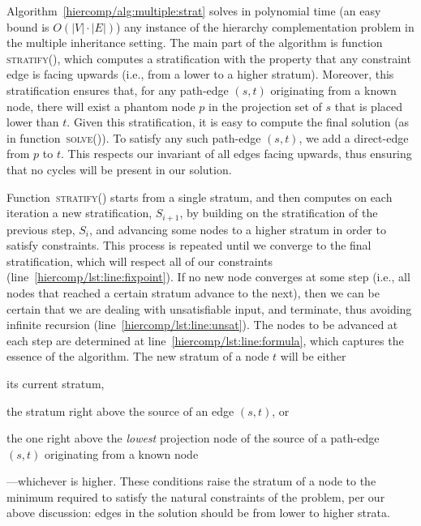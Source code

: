 

Algorithm~\ref{hiercomp/alg:multiple:strat} solves in polynomial time (an easy bound is
$O(|V| \cdot |E|)$) any
instance of the hierarchy complementation problem in the multiple
inheritance setting. The main part of the algorithm is
function \textsc{stratify()}, which computes a stratification with the
property that any constraint edge is facing upwards (i.e., from a
lower to a higher stratum). Moreover, this stratification ensures
that, for any path-edge $(s,t)$ originating from a known node, there
will exist a phantom node $p$ in the projection set of $s$ that is
placed lower than $t$. Given this stratification, it is easy to
compute the final solution (as in function~\textsc{solve()}). To
satisfy any such path-edge $(s,t)$, we add a direct-edge from $p$ to
$t$. This respects our invariant of all edges facing upwards, thus
ensuring that no cycles will be present in our solution.

Function~\textsc{stratify()} starts from a single stratum, and then
computes on each iteration a new stratification, $S_{i+1}$, by
building on the stratification of the previous step, $S_{i}$, and
advancing some nodes to a higher stratum in order to satisfy
constraints. This process is repeated until we converge to the final
stratification, which will respect all of our constraints
(line~\ref{hiercomp/lst:line:fixpoint}). If no new node converges at some step
(i.e., all nodes that reached a certain stratum advance to the next),
then we can be certain that we are dealing with unsatisfiable input,
and terminate, thus avoiding infinite recursion
(line~\ref{hiercomp/lst:line:unsat}). The nodes to be advanced at each step are
determined at line~\ref{hiercomp/lst:line:formula}, which captures the essence
of the algorithm. The new stratum of a node $t$ will be either
\begin{inparaenum}[(i)]
\item its current stratum,
\item the stratum right above the source of an edge $(s,t)$, or
\item the one right above the \emph{lowest} projection node of the
  source of a path-edge $(s,t)$ originating from a known node%
\end{inparaenum}%
---whichever is higher.  These conditions raise the stratum of a node
to the minimum required to satisfy the natural constraints of the
problem, per our above discussion: edges in the solution should be
from lower to higher strata.

